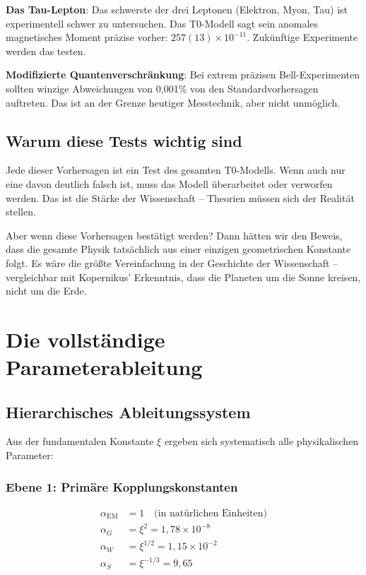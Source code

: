 \documentclass[12pt,a4paper]{article}
\newcommand{\xipar}{\ensuremath{\xi}}
\begin{document}
	\textbf{Das Tau-Lepton}: Das schwerste der drei Leptonen (Elektron, Myon, Tau) ist experimentell schwer zu untersuchen. Das T0-Modell sagt sein anomales magnetisches Moment präzise vorher: $257(13) \times 10^{-11}$. Zukünftige Experimente werden das testen.
	
	\textbf{Modifizierte Quantenverschränkung}: Bei extrem präzisen Bell-Experimenten sollten winzige Abweichungen von 0,001\% von den Standardvorhersagen auftreten. Das ist an der Grenze heutiger Messtechnik, aber nicht unmöglich.
	
	\subsection{Warum diese Tests wichtig sind}
	
	Jede dieser Vorhersagen ist ein Test des gesamten T0-Modells. Wenn auch nur eine davon deutlich falsch ist, muss das Modell überarbeitet oder verworfen werden. Das ist die Stärke der Wissenschaft -- Theorien müssen sich der Realität stellen.
	
	Aber wenn diese Vorhersagen bestätigt werden? Dann hätten wir den Beweis, dass die gesamte Physik tatsächlich aus einer einzigen geometrischen Konstante folgt. Es wäre die größte Vereinfachung in der Geschichte der Wissenschaft -- vergleichbar mit Kopernikus' Erkenntnis, dass die Planeten um die Sonne kreisen, nicht um die Erde.
	
	\section{Die vollständige Parameterableitung}
	
	\subsection{Hierarchisches Ableitungssystem}
	
	Aus der fundamentalen Konstante $\xipar$ ergeben sich systematisch alle physikalischen Parameter:
	
	\subsubsection{Ebene 1: Primäre Kopplungskonstanten}
	\begin{align}
		\alpha_{\text{EM}} &= 1 \quad \text{(in natürlichen Einheiten)} \\
		\alpha_G &= \xipar^2 = 1,78 \times 10^{-8} \\
		\alpha_W &= \xipar^{1/2} = 1,15 \times 10^{-2} \\
		\alpha_S &= \xipar^{-1/3} = 9,65
	\end{align}
	
\end{document}
